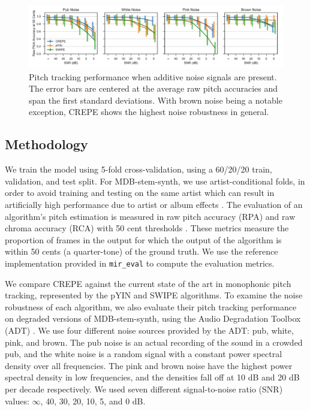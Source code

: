 \begin{figure}[b!]
	\includegraphics[width=\textwidth]{noise.pdf}
	\caption{Pitch tracking performance when additive noise signals are present. The error bars are centered at the average raw pitch accuracies and span the first standard deviations. With brown noise being a notable exception, CREPE shows the highest noise robustness in general. }
	\label{fig:noise}
\end{figure}


\subsection{Methodology}

We train the model using 5-fold cross-validation, using a 60/20/20 train, validation, and test split.
For MDB-stem-synth, we use artist-conditional folds, in order to avoid training and testing on the same artist which can result in artificially high performance due to artist or album effects \cite{sturm2013classification}.
The evaluation of an algorithm's pitch estimation is measured in raw pitch accuracy (RPA) and raw chroma accuracy (RCA) with 50 cent thresholds \cite{salamon2014melody}.
These metrics measure the proportion of frames in the output for which the output of the algorithm is within 50 cents (a quarter-tone) of the ground truth.
We use the reference implementation provided in \texttt{mir\_eval} \cite{raffel2014mir_eval} to compute the evaluation metrics.

We compare CREPE against the current state of the art in monophonic pitch tracking, represented by the pYIN \cite{mauch2014pyin} and SWIPE \cite{camacho2008swipe} algorithms.
To examine the noise robustness of each algorithm, we also evaluate their pitch tracking performance on degraded versions of MDB-stem-synth, using the Audio Degradation Toolbox (ADT) \cite{mauch2013adt}.
We use four different noise sources provided by the ADT: pub, white, pink, and brown.
The pub noise is an actual recording of the sound in a crowded pub, 
and the white noise is a random signal with a constant power spectral density over all frequencies.
The pink and brown noise have the highest power spectral density in low frequencies, and the densities fall off at 10 dB and 20 dB per decade respectively.
We used seven different signal-to-noise ratio (SNR) values: $\infty$, 40, 30, 20, 10, 5, and 0 dB.


